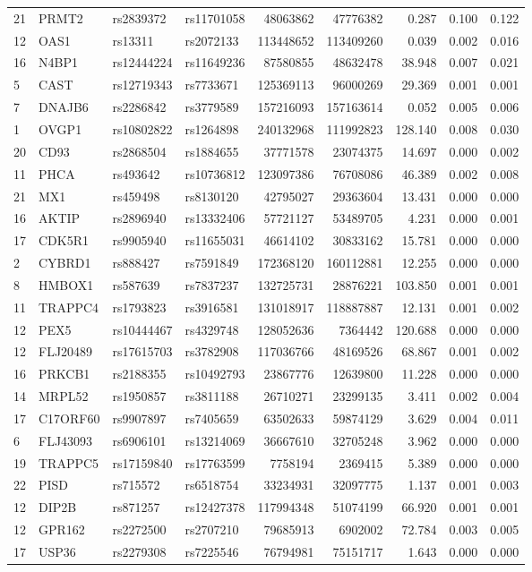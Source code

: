 \documentclass{article}
\begin{document}
\begin{table}[ht]
{\begin{threeparttable}
\begin{tabular}{llllrrrrr}
21 & PRMT2 & rs2839372 & rs11701058 & 48063862 & 47776382 & 0.287 & 0.100 & 0.122 \\
12 & OAS1 & rs13311 & rs2072133 & 113448652 & 113409260 & 0.039 & 0.002 & 0.016 \\
16 & N4BP1 & rs12444224 & rs11649236 & 87580855 & 48632478 & 38.948 & 0.007 & 0.021 \\
5 & CAST & rs12719343 & rs7733671 & 125369113 & 96000269 & 29.369 & 0.001 & 0.001 \\
7 & DNAJB6 & rs2286842 & rs3779589 & 157216093 & 157163614 & 0.052 & 0.005 & 0.006 \\
1 & OVGP1 & rs10802822 & rs1264898 & 240132968 & 111992823 & 128.140 & 0.008 & 0.030 \\
20 & CD93 & rs2868504 & rs1884655 & 37771578 & 23074375 & 14.697 & 0.000 & 0.002 \\
11 & PHCA & rs493642 & rs10736812 & 123097386 & 76708086 & 46.389 & 0.002 & 0.008 \\
21 & MX1 & rs459498 & rs8130120 & 42795027 & 29363604 & 13.431 & 0.000 & 0.000 \\
16 & AKTIP & rs2896940 & rs13332406 & 57721127 & 53489705 & 4.231 & 0.000 & 0.001 \\
17 & CDK5R1 & rs9905940 & rs11655031 & 46614102 & 30833162 & 15.781 & 0.000 & 0.000 \\
2 & CYBRD1 & rs888427 & rs7591849 & 172368120 & 160112881 & 12.255 & 0.000 & 0.000 \\
8 & HMBOX1 & rs587639 & rs7837237 & 132725731 & 28876221 & 103.850 & 0.001 & 0.001 \\
11 & TRAPPC4 & rs1793823 & rs3916581 & 131018917 & 118887887 & 12.131 & 0.001 & 0.002 \\
12 & PEX5 & rs10444467 & rs4329748 & 128052636 & 7364442 & 120.688 & 0.000 & 0.000 \\
12 & FLJ20489 & rs17615703 & rs3782908 & 117036766 & 48169526 & 68.867 & 0.001 & 0.002 \\
16 & PRKCB1 & rs2188355 & rs10492793 & 23867776 & 12639800 & 11.228 & 0.000 & 0.000 \\
14 & MRPL52 & rs1950857 & rs3811188 & 26710271 & 23299135 & 3.411 & 0.002 & 0.004 \\
17 & C17ORF60 & rs9907897 & rs7405659 & 63502633 & 59874129 & 3.629 & 0.004 & 0.011 \\
6 & FLJ43093 & rs6906101 & rs13214069 & 36667610 & 32705248 & 3.962 & 0.000 & 0.000 \\
19 & TRAPPC5 & rs17159840 & rs17763599 & 7758194 & 2369415 & 5.389 & 0.000 & 0.000 \\
22 & PISD & rs715572 & rs6518754 & 33234931 & 32097775 & 1.137 & 0.001 & 0.003 \\
12 & DIP2B & rs871257 & rs12427378 & 117994348 & 51074199 & 66.920 & 0.001 & 0.001 \\
12 & GPR162 & rs2272500 & rs2707210 & 79685913 & 6902002 & 72.784 & 0.003 & 0.005 \\
17 & USP36 & rs2279308 & rs7225546 & 76794981 & 75151717 & 1.643 & 0.000 & 0.000 \\
\hline
\end{tabular}
\end{threeparttable}
}
\end{table}
\end{document}
